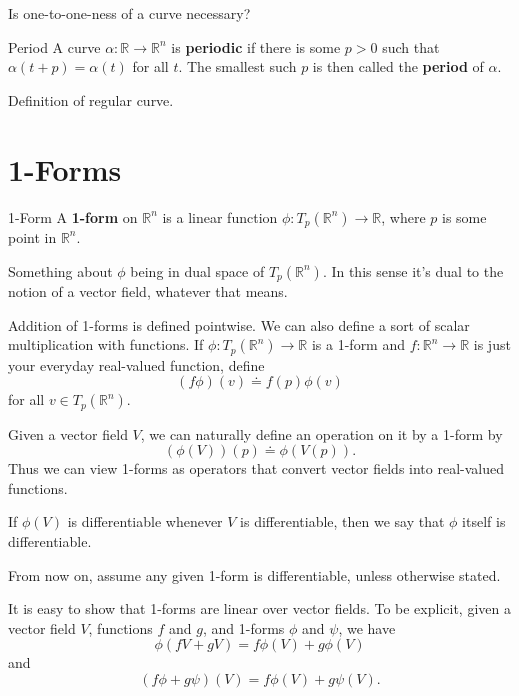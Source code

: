 \documentclass[10pt]{report}
\begin{document}
{\color{red}Is one-to-one-ness of a curve necessary?}

\begin{defn}{Period}{}
	A curve $\alpha:\mathbb{R}\to \mathbb{R}^n$ is \textbf{periodic} if there is some $p>0$ such that $\alpha(t+p) = \alpha(t)$ for all $t$. The smallest such $p$ is then called the \textbf{period} of $\alpha$.
\end{defn}

{\color{red}Definition of regular curve.}



\section{1-Forms}

\begin{defn}{1-Form}{}
	A \textbf{1-form} on $\mathbb{R}^n$ is a linear function $\phi:T_p(\mathbb{R}^n)\to \mathbb{R}$, where $p$ is some point in $\mathbb{R}^n$.
\end{defn}

{\color{red}Something about $\phi$ being in dual space of $T_p(\mathbb{R}^n)$. In this sense it's dual to the notion of a vector field, whatever that means.}

Addition of 1-forms is defined pointwise. We can also define a sort of scalar multiplication with functions. If $\phi:T_p(\mathbb{R}^n)\to \mathbb{R}$ is a 1-form and $f:\mathbb{R}^n\to \mathbb{R}$ is just your everyday real-valued function, define
\[
	(f\phi)(v) \doteq f(p) \phi(v)
\] for all $v \in T_p(\mathbb{R}^n)$.

Given a vector field $V$, we can naturally define an operation on it by a 1-form by
\[
	(\phi(V))(p) \doteq \phi(V(p)).
\] Thus we can view 1-forms as operators that convert vector fields into real-valued functions.

If $\phi(V)$ is differentiable whenever $V$ is differentiable, then we say that $\phi$ itself is differentiable.

\begin{note}{}{}
From now on, assume any given 1-form is differentiable, unless otherwise stated.
\end{note}

It is easy to show that 1-forms are linear over vector fields. To be explicit, given a vector field $V$, functions $f$ and $g$, and 1-forms $\phi$ and $\psi$, we have
\[
	 \phi(fV + gV) = f \phi(V) + g\phi(V)
\] and
\[
	(f\phi+g\psi)(V) = f\phi(V) + g\psi(V).
\] 
\end{document}
